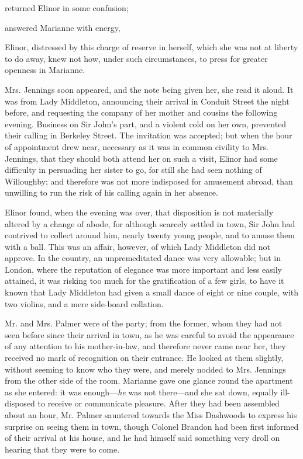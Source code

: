  returned Elinor in some confusion; 

 answered Marianne with energy, 

Elinor, distressed by this charge of reserve in herself, which she was not at liberty to do away, knew not how, under such circumstances, to press for greater openness in Marianne.

Mrs. Jennings soon appeared, and the note being given her, she read it aloud. It was from Lady Middleton, announcing their arrival in Conduit Street the night before, and requesting the company of her mother and cousins the following evening. Business on Sir John's part, and a violent cold on her own, prevented their calling in Berkeley Street. The invitation was accepted; but when the hour of appointment drew near, necessary as it was in common civility to Mrs. Jennings, that they should both attend her on such a visit, Elinor had some difficulty in persuading her sister to go, for still she had seen nothing of Willoughby; and therefore was not more indisposed for amusement abroad, than unwilling to run the risk of his calling again in her absence.

Elinor found, when the evening was over, that disposition is not materially altered by a change of abode, for although scarcely settled in town, Sir John had contrived to collect around him, nearly twenty young people, and to amuse them with a ball. This was an affair, however, of which Lady Middleton did not approve. In the country, an unpremeditated dance was very allowable; but in London, where the reputation of elegance was more important and less easily attained, it was risking too much for the gratification of a few girls, to have it known that Lady Middleton had given a small dance of eight or nine couple, with two violins, and a mere side-board collation.

Mr. and Mrs. Palmer were of the party; from the former, whom they had not seen before since their arrival in town, as he was careful to avoid the appearance of any attention to his mother-in-law, and therefore never came near her, they received no mark of recognition on their entrance. He looked at them slightly, without seeming to know who they were, and merely nodded to Mrs. Jennings from the other side of the room. Marianne gave one glance round the apartment as she entered: it was enough---{\em he} was not there---and she sat down, equally ill-disposed to receive or communicate pleasure. After they had been assembled about an hour, Mr. Palmer sauntered towards the Miss Dashwoods to express his surprise on seeing them in town, though Colonel Brandon had been first informed of their arrival at his house, and he had himself said something very droll on hearing that they were to come.


